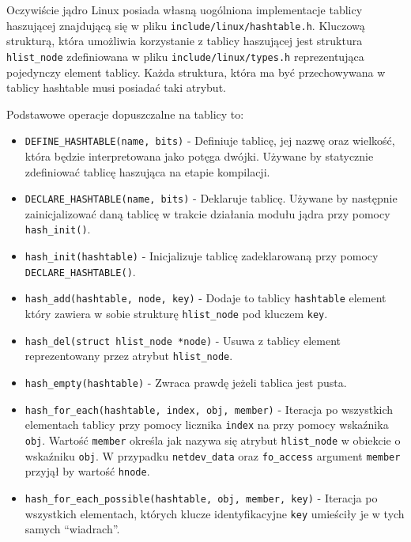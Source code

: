 \documentclass[10pt]{article}
\begin{document}
Oczywiście jądro Linux posiada własną uogólniona implementacje tablicy haszującej znajdującą się w pliku \texttt{include/linux/hashtable.h}.  Kluczową strukturą, która umożliwia korzystanie z tablicy haszującej jest struktura \texttt{hlist\_node} zdefiniowana w pliku \texttt{include/linux/types.h} reprezentująca pojedynczy element tablicy. Każda struktura, która ma być przechowywana w tablicy hashtable musi posiadać taki atrybut.

Podstawowe operacje dopuszczalne na tablicy to:

\begin{itemize}
\itemsep1pt\parskip0pt
\item
  \texttt{DEFINE\_HASHTABLE(name, bits)} - Definiuje tablicę, jej nazwę
  oraz wielkość, która będzie interpretowana jako potęga dwójki. Używane
  by statycznie zdefiniować tablicę haszująca na etapie kompilacji.
\item
  \texttt{DECLARE\_HASHTABLE(name, bits)} - Deklaruje tablicę. Używane
  by następnie zainicjalizować daną tablicę w trakcie działania modułu
  jądra przy pomocy \texttt{hash\_init()}.
\item
  \texttt{hash\_init(hashtable)} - Inicjalizuje tablicę zadeklarowaną
  przy pomocy \texttt{DECLARE\_HASHTABLE()}.
\item
  \texttt{hash\_add(hashtable, node, key)} - Dodaje to tablicy
  \texttt{hashtable} element który zawiera w sobie strukturę
  \texttt{hlist\_node} pod kluczem \texttt{key}.
\item
  \texttt{hash\_del(struct hlist\_node *node)} - Usuwa z tablicy element
  reprezentowany przez atrybut \texttt{hlist\_node}.
\item
  \texttt{hash\_empty(hashtable)} - Zwraca prawdę jeżeli tablica jest
  pusta.
\item
  \texttt{hash\_for\_each(hashtable, index, obj, member)} - Iteracja po
  wszystkich elementach tablicy przy pomocy licznika \texttt{index} na
  przy pomocy wskaźnika \texttt{obj}. Wartość \texttt{member} określa
  jak nazywa się atrybut \texttt{hlist\_node} w obiekcie o wskaźniku
  \texttt{obj}. W przypadku \texttt{netdev\_data} oraz
  \texttt{fo\_access} argument \texttt{member} przyjął by wartość
  \texttt{hnode}.
\item
  \texttt{hash\_for\_each\_possible(hashtable, obj, member, key)} -
  Iteracja po wszystkich elementach, których klucze identyfikacyjne
  \texttt{key} umieściły je w tych samych ``wiadrach''.
\end{itemize}
\end{document}

